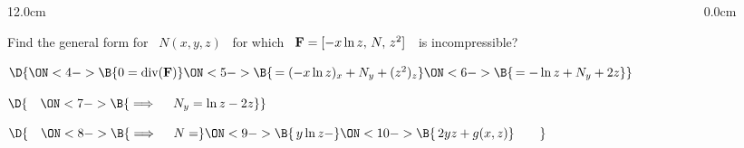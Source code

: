 \begin{frame}
\frametitle{}
\scriptsize
\begin{columns}\begin{column}{12.0cm}

\EX Find the general form for \, $N(x,y,z)$ \, for which \, ${\bf F} = [-x\ln z,\, N,\, z^2]$ \,\, is incompressible?

\vspace{0.2cm}


\vspace{0.2cm}


\vspace{0.2cm}

$\D{
\ON<4->{\B{0 = \text{div}({\bf F})}}
\ON<5->{\B{ \, = (-x\ln z)_x + N_y + (z^2)_z }}
\ON<6->{\B{ \, = -\ln z + N_y + 2z}}}$

\vspace{0.2cm}

$\D{\quad 
\ON<7->{\B{\implies \quad N_y = \ln z - 2z}}}$

\vspace{0.2cm}

$\D{\quad 
\ON<8->{\B{\implies \quad N = }}
\ON<9->{\B{\, y\ln z - }}
\ON<10->{\B{\,2yz + g(x,z)}} \qquad }$ 
 
\vspace{5.8cm}

	
\end{column}\begin{column}{0.0cm}\end{column}\end{columns}
\end{frame}


